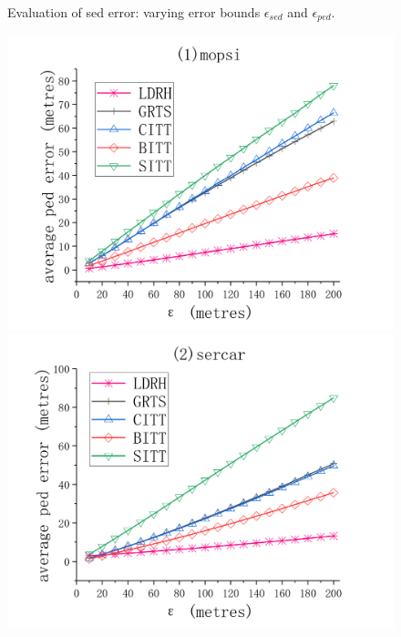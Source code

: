 {{\begin{figure}[tb!]
	\caption{\small Evaluation of sed error: varying error bounds $\epsilon_{sed}$ and $\epsilon_{ped}$.}
	\label{fig:sed-error}
\end{figure}

\begin{figure}[tb!]
	\centering
	\includegraphics[scale = 0.210]{figures/Fig-mopsi-ped-error.png}\hspace{1ex}
	\includegraphics[scale = 0.210]{figures/Fig-sercar-ped-error.png}\hspace{1ex}

\end{figure}}}
